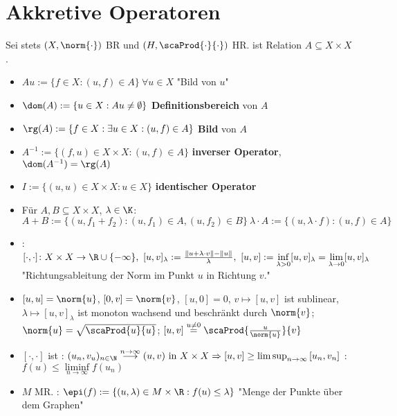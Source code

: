 	\section{Akkretive Operatoren}
	Sei stets $(X,\norm{\cdot})$ BR und $(H,\scaProd{\cdot}{\cdot})$ HR.
	 ist Relation $A\subseteq X\times X$.
	\begin{itemize}
		\item $Au:=\lbrace f\in X:(u,f)\in A\rbrace~\forall u\in X$ "Bild von $u$"
		\item $\dom(A):=\lbrace u\in X:Au\neq\emptyset\rbrace$ \textbf{Definitionsbereich} von $A$
		\item $\rg(A):=\lbrace f\in X:\exists u\in X:(u,f)\in A\rbrace$ \textbf{Bild} von $A$
		\item $A^{-1}:=\lbrace (f,u)\in X\times X:(u,f)\in A\rbrace$ \textbf{inverser Operator}, $\dom(A^{-1})=\rg(A)$
		\item $I:=\lbrace(u,u)\in X\times X:u\in X\rbrace$ \textbf{identischer Operator}
		\item Für $A,B\subseteq X\times X$, $\lambda\in\K$:
		$
			A+B:=\lbrace(u,f_1+f_2):(u,f_1)\in A,(u,f_2)\in B\rbrace~%
			\lambda\cdot A:=\lbrace(u,\lambda\cdot f):(u,f)\in A\rbrace%
		$
		\item {}: $[\cdot,\cdot]\colon X\times X\to\R\cup\lbrace-\infty\rbrace,~[u,v]_\lambda:=\frac{\Vert u+\lambda\cdot v\Vert-\Vert u\Vert}{\lambda},~
		[u,v]:=\inf\limits_{\lambda>0}[u,v]_\lambda=\lim\limits_{\lambda\to0}[u,v]_\lambda$\\
		"Richtungsableitung der Norm im Punkt $u$ in Richtung $v$."
		\item $[u,u]=\norm{u}$, $[0,v]=\norm{v}$, $[u,0]=0$, $v\mapsto[u,v]$ ist sublinear, $\lambda\mapsto[u,v]_\lambda$ ist monoton wachsend und beschränkt durch $\norm{v}$;  $\norm{u}=\sqrt{\scaProd{u}{u}}$; $[u,v]\overset{u\neq0}{=}\scaProd{\frac{u}{\norm{u}}}{v}$
		\item $[\cdot,\cdot]$ ist : $(u_n,v_u)_{n\in\N}\overset{n\to\infty}{\longrightarrow}(u,v)\text{ in }X\times X\Rightarrow\left[u,v\right]\geq\limsup_{n\to\infty}\left[u_n,v_n\right]$
		: $f(u)\leq\liminf\limits_{n\to\infty} f(u_n)$
		\item $M$ MR. : $\epi(f):=\lbrace(u,\lambda)\in M\times\R:f(u)\leq\lambda\rbrace$ "Menge der Punkte über dem Graphen"

\end{itemize}
